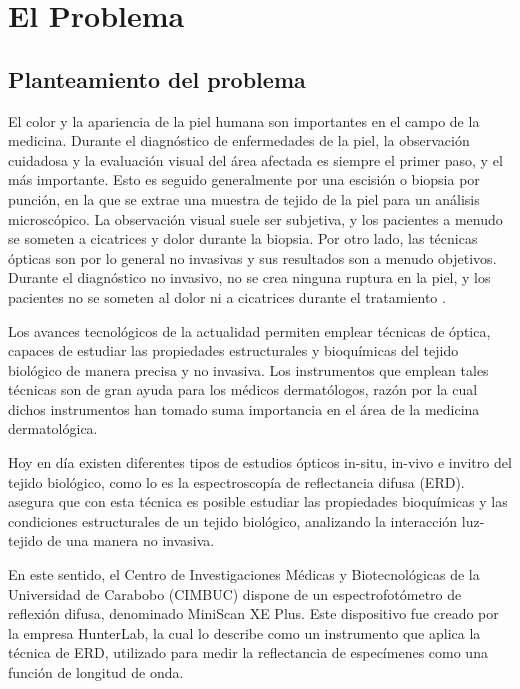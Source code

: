 \chapter{El Problema}

	\section{Planteamiento del problema}	
El color y la apariencia de la piel humana son importantes en el campo de la medicina. Durante el diagn\'{o}stico de enfermedades de la piel, la observaci\'{o}n cuidadosa y la evaluaci\'{o}n visual del \'{a}rea afectada es siempre el primer paso, y el m\'{a}s importante. Esto es seguido generalmente por una escisi\'{o}n o biopsia por punci\'{o}n, en la que se extrae una muestra de tejido de la piel para un an\'{a}lisis microsc\'{o}pico. La observaci\'{o}n visual suele ser subjetiva, y los pacientes a menudo se someten a cicatrices y dolor durante la biopsia. Por otro lado, las t\'{e}cnicas \'{o}pticas son por lo general no invasivas y sus resultados son a menudo objetivos. Durante el diagn\'{o}stico no invasivo, no se crea ninguna ruptura en la piel, y los pacientes no se someten al dolor ni a cicatrices durante el tratamiento \cite{Bersha}.

Los avances tecnol\'{o}gicos de la actualidad permiten emplear t\'{e}cnicas de \'{o}ptica, capaces de estudiar  las propiedades estructurales y bioqu\'{i}micas del tejido biol\'{o}gico de manera precisa y no invasiva. Los instrumentos que emplean tales t\'{e}cnicas son de gran ayuda para los m\'{e}dicos dermat\'{o}logos, raz\'{o}n por la cual dichos instrumentos han tomado suma importancia en el \'{a}rea de la medicina dermatol\'{o}gica.

Hoy en d\'{i}a existen diferentes tipos de estudios \'{o}pticos in-situ, in-vivo e invitro del tejido biol\'{o}gico, como lo es la espectroscop\'{i}a de reflectancia difusa (ERD).  asegura que con esta t\'{e}cnica es  posible estudiar las propiedades bioqu\'{i}micas y las condiciones estructurales de un tejido biol\'{o}gico, analizando la interacci\'{o}n luz-tejido de una manera no invasiva.

En este sentido, el Centro de Investigaciones M\'{e}dicas y Biotecnol\'{o}gicas de la Universidad de Carabobo (CIMBUC) dispone de un espectrofot\'{o}metro de reflexi\'{o}n difusa, denominado MiniScan XE Plus. Este dispositivo fue creado por la empresa HunterLab, la cual lo describe como un instrumento que aplica la t\'{e}cnica de ERD, utilizado para medir la reflectancia de espec\'{i}menes como una funci\'{o}n de longitud de onda.

